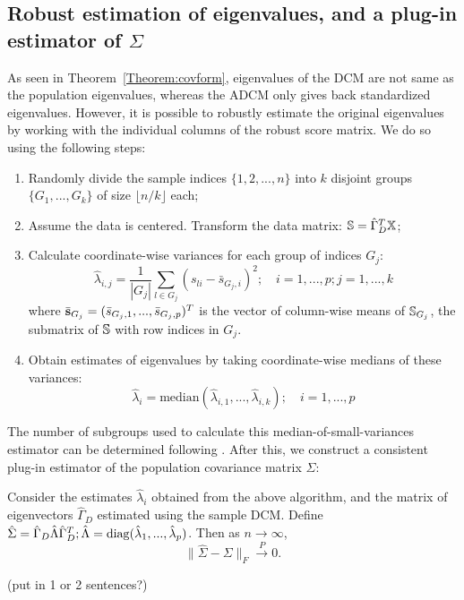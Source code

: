 \subsection{Robust estimation of eigenvalues, and a plug-in estimator of $\Sigma$}

As seen in Theorem~\ref{Theorem:covform}, eigenvalues of the DCM are not same as the population eigenvalues, whereas the ADCM only gives back standardized eigenvalues. However, it is possible to robustly estimate the original eigenvalues by working with the individual columns of the robust score matrix. We do so using the following steps:

\begin{enumerate}
\item Randomly divide the sample indices $\{1,2,...,n\}$ into $k$ disjoint groups $\{G_1,...,G_k \}$ of size $\lfloor n/k \rfloor$ each;

\item Assume the data is centered. Transform the data matrix: ${\mathbb{S}} = \hat\Gamma^T_D {\mathbb{X}}$;

\item Calculate coordinate-wise variances for each group of indices $G_j$:
%
$$
\hat\lambda_{i,j} = \frac{1}{|G_j|} \sum_{l \in G_j} (s_{li} - \bar s_{G_j,i})^2; \quad i = 1,...,p; j = 1,...,k
$$
where $\bar{{\bf{s}}}_{G_j} = (\bar s_{G_j,1}, ..., \bar s_{G_j,p})^T$ is the vector of column-wise means of ${\mathbb{S}}_{G_j}$, the submatrix of ${\mathbb{S}}$ with row indices in $G_j$.
%
\item Obtain estimates of eigenvalues by taking coordinate-wise medians of these variances:
%
$$
\hat \lambda_i = \text{median} (\hat\lambda_{i,1}, ... , \hat\lambda_{i,k} ); \quad i = 1,...,p
$$
%
\end{enumerate}
%
The number of subgroups used to calculate this median-of-small-variances estimator can be determined following \cite{Minsker15}. After this, we construct a consistent plug-in estimator of the population covariance matrix $\Sigma$:

\begin{Theorem}\label{Thm:pluginSigma}
Consider the estimates $\hat\lambda_i$ obtained from the above algorithm, and the matrix of eigenvectors $\hat\Gamma_D$ estimated using the sample DCM. Define $\hat\Sigma = \hat\Gamma_D \hat\Lambda \hat\Gamma_D^T; \hat\Lambda = \operatorname*{diag}(\hat\lambda_1, ..., \hat\lambda_p)$. Then as $n \rightarrow \infty$,
%
$$
\| \hat\Sigma - \Sigma \|_F \stackrel{P}{\rightarrow} 0.
$$
%
\end{Theorem}

{\colrbf (put in 1 or 2 sentences?)}

